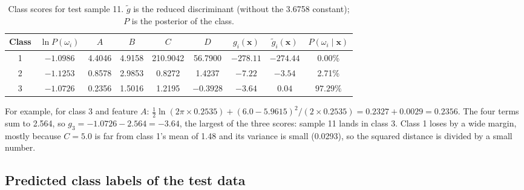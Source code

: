 \begin{table}[H]
\centering
\footnotesize
\caption{Class scores for test sample 11. $\tilde{g}$ is the reduced discriminant (without the 3.6758 constant); $P$ is the
posterior of the class.}
\begin{tabular}{@{}ccccccccc@{}}
\toprule
Class & $\ln P(\omega_i)$ & $A$ & $B$ & $C$ & $D$ & $g_i(\mathbf{x})$ & $\tilde{g}_i(\mathbf{x})$ & $P(\omega_i\mid\mathbf{x})$ \\
\midrule
1 & $-1.0986$ & 4.4046 & 4.9158 & 210.9042 & 56.7900 & $-278.11$ & $-274.44$ & 0.00\% \\
2 & $-1.1253$ & 0.8578 & 2.9853 & 0.8272 & 1.4237 & $-7.22$ & $-3.54$ & 2.71\% \\
3 & $-1.0726$ & 0.2356 & 1.5016 & 1.2195 & $-0.3928$ & $\mathbf{-3.64}$ & $\mathbf{0.04}$ & $\mathbf{97.29\%}$ \\
\bottomrule
\end{tabular}
\end{table}

For example, for class 3 and feature $A$: $\tfrac{1}{2}\ln(2\pi\times 0.2535) + (6.0-5.9615)^2/(2\times 0.2535) = 0.2327 +
0.0029 = 0.2356$. The four terms sum to 2.564, so $g_3 = -1.0726 - 2.564 = -3.64$, the largest of the three scores: sample 11
lands in class 3. Class 1 loses by a wide margin, mostly because $C = 5.0$ is far from class 1's mean of 1.48 and its variance
is small (0.0293), so the squared distance is divided by a small number.

\subsection{Predicted class labels of the test data}

